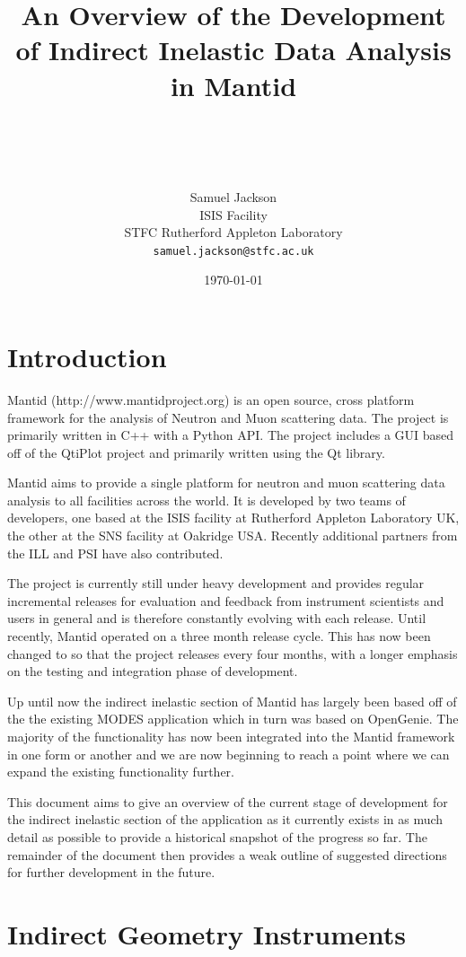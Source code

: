 \documentclass[paper=a4, fontsize=11pt]{scrartcl}	%
\title{ \vspace{-1in} 	\usefont{OT1}{bch}{b}{n}
		\huge \strut An Overview of the Development of Indirect Inelastic Data Analysis in Mantid\strut \\
}
\author{ 									\usefont{OT1}{bch}{m}{n}
        Samuel Jackson\\		\usefont{OT1}{bch}{m}{n}
		ISIS Facility\\	\usefont{OT1}{bch}{m}{n}
        STFC Rutherford Appleton Laboratory\\
        \texttt{samuel.jackson@stfc.ac.uk}
}
\date{\today}
\numberwithin{equation}{section}															%
\numberwithin{figure}{section}																%
\numberwithin{table}{section}																%
\begin{document}
\maketitle
\clearpage
\tableofcontents
\section{Introduction}
Mantid (http://www.mantidproject.org) is an open source, cross platform framework for the analysis of Neutron and Muon scattering data. The project is primarily written in C++ with a Python API. The project includes a GUI based off of the QtiPlot project and primarily written using the Qt library.

Mantid aims to provide a single platform for neutron and muon scattering data analysis to all facilities across the world. It is developed by two teams of developers, one based at the ISIS facility at Rutherford Appleton Laboratory UK, the other at the SNS facility at Oakridge USA. Recently additional partners from the ILL and PSI have also contributed.

The project is currently still under heavy development and provides regular incremental releases for evaluation and feedback from instrument scientists and users in general and is therefore constantly evolving with each release. Until recently, Mantid operated on a three month release cycle. This has now been changed to so that the project releases every four months, with a longer emphasis on the testing and integration phase of development.

Up until now the indirect inelastic section of Mantid has largely been based off of the the existing MODES application which in turn was based on OpenGenie\cite{wshowells2010}. The majority of the functionality has now been integrated into the Mantid framework in one form or another and we are now beginning to reach a point where we can expand the existing functionality further.

This document aims to give an overview of the current stage of development for the indirect inelastic section of the application as it currently exists in as much detail as possible to provide a historical snapshot of the progress so far. The remainder of the document then provides a weak outline of suggested directions for further development in the future.


\section{Indirect Geometry Instruments}
\end{document}
